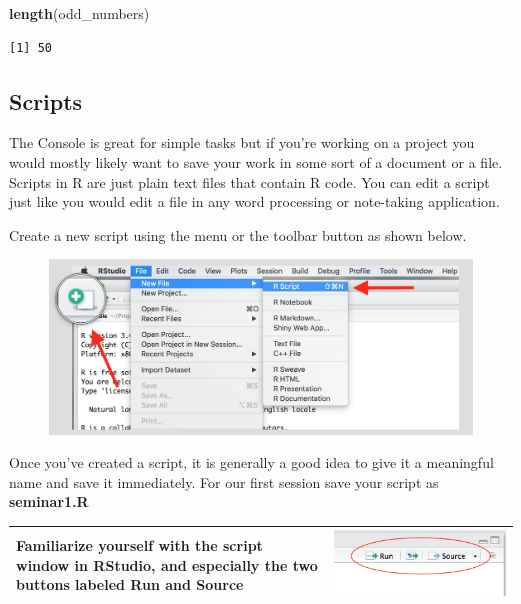 \documentclass[]{book}
\newenvironment{Shaded}{\begin{snugshade}}{\end{snugshade}}
\newcommand{\KeywordTok}[1]{\textcolor[rgb]{0.13,0.29,0.53}{\textbf{#1}}}
\newcommand{\NormalTok}[1]{#1}
\theoremstyle{definition}
\theoremstyle{definition}
\theoremstyle{definition}
\theoremstyle{remark}
\begin{document}
\begin{Shaded}
\begin{Highlighting}[]
\KeywordTok{length}\NormalTok{(odd_numbers)}
\end{Highlighting}
\end{Shaded}

\begin{verbatim}
[1] 50
\end{verbatim}

\subsection{Scripts}\label{scripts}

The Console is great for simple tasks but if you're working on a project
you would mostly likely want to save your work in some sort of a
document or a file. Scripts in R are just plain text files that contain
R code. You can edit a script just like you would edit a file in any
word processing or note-taking application.

Create a new script using the menu or the toolbar button as shown below.

\begin{figure}
\centering
\includegraphics{./img/rstudio_newfile.png}
\caption{}
\end{figure}

Once you've created a script, it is generally a good idea to give it a
meaningful name and save it immediately. For our first session save your
script as \textbf{seminar1.R}

\begin{longtable}[]{@{}ll@{}}
\toprule
\begin{minipage}[t]{0.52\columnwidth}\raggedright\strut
Familiarize yourself with the script window in RStudio, and especially
the two buttons labeled \textbf{Run} and \textbf{Source}\strut
\end{minipage} & \begin{minipage}[t]{0.42\columnwidth}\raggedright\strut
\includegraphics{./img/rstudio_script.png}\strut
\end{minipage}\tabularnewline
\bottomrule
\end{longtable}
\end{document}
